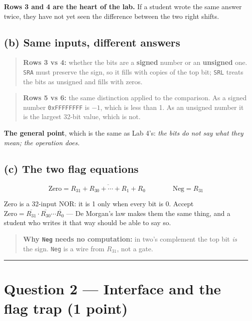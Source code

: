 \documentclass[11pt]{article}
\newcommand{\code}[1]{\texttt{#1}}
\newcommand{\hr}{\vspace{2pt}\hrule\vspace{6pt}}
\begin{document}
\textbf{Rows 3 and 4 are the heart of the lab.} If a student wrote the same answer
twice, they have not yet seen the difference between the two right shifts.

\subsection*{(b) Same inputs, different answers}

\begin{quote}
\textbf{Rows 3 vs 4:} whether the bits are a \textbf{signed} number or an
\textbf{unsigned} one. \code{SRA} must preserve the sign, so it fills with copies
of the top bit; \code{SRL} treats the bits as unsigned and fills with zeros.
\end{quote}

\begin{quote}
\textbf{Rows 5 vs 6:} the same distinction applied to the comparison. As a signed
number \code{0xFFFFFFFF} is $-1$, which is less than 1. As an unsigned number it
is the largest 32-bit value, which is not.
\end{quote}

\textbf{The general point}, which is the same as Lab 4's: \emph{the bits do not
say what they mean; the operation does.}

\subsection*{(c) The two flag equations}

\[
\text{Zero} = \overline{R_{31} + R_{30} + \cdots + R_1 + R_0}
\qquad\qquad
\text{Neg} = R_{31}
\]

Zero is a 32-input NOR: it is 1 only when every bit is 0. Accept
$\text{Zero} = \overline{R_{31}} \cdot \overline{R_{30}} \cdots \overline{R_0}$ ---
De Morgan's law makes them the same thing, and a student who writes it that way
should be able to say so.

\begin{quote}
\textbf{Why \code{Neg} needs no computation:} in two's complement the top bit
\emph{is} the sign. \code{Neg} is a wire from $R_{31}$, not a gate.
\end{quote}

\vspace{4pt}\hr

\section*{Question 2 --- Interface and the flag trap (1 point)}
\end{document}
